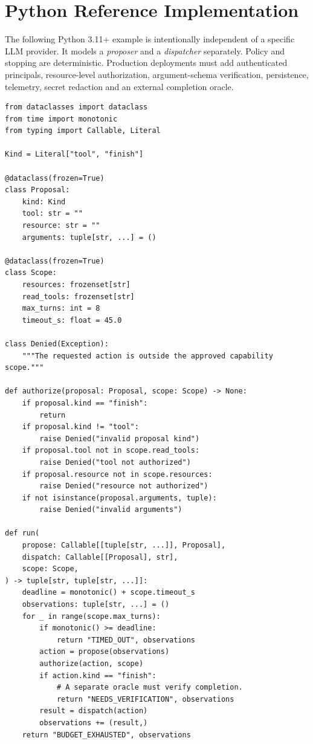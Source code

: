 
\section{Python Reference Implementation}
The following Python 3.11+ example is intentionally independent of a specific LLM provider. It models a \emph{proposer} and a \emph{dispatcher} separately. Policy and stopping are deterministic. Production deployments must add authenticated principals, resource-level authorization, argument-schema verification, persistence, telemetry, secret redaction and an external completion oracle.

\begin{verbatim}
from dataclasses import dataclass
from time import monotonic
from typing import Callable, Literal

Kind = Literal["tool", "finish"]

@dataclass(frozen=True)
class Proposal:
    kind: Kind
    tool: str = ""
    resource: str = ""
    arguments: tuple[str, ...] = ()

@dataclass(frozen=True)
class Scope:
    resources: frozenset[str]
    read_tools: frozenset[str]
    max_turns: int = 8
    timeout_s: float = 45.0

class Denied(Exception):
    """The requested action is outside the approved capability scope."""

def authorize(proposal: Proposal, scope: Scope) -> None:
    if proposal.kind == "finish":
        return
    if proposal.kind != "tool":
        raise Denied("invalid proposal kind")
    if proposal.tool not in scope.read_tools:
        raise Denied("tool not authorized")
    if proposal.resource not in scope.resources:
        raise Denied("resource not authorized")
    if not isinstance(proposal.arguments, tuple):
        raise Denied("invalid arguments")

def run(
    propose: Callable[[tuple[str, ...]], Proposal],
    dispatch: Callable[[Proposal], str],
    scope: Scope,
) -> tuple[str, tuple[str, ...]]:
    deadline = monotonic() + scope.timeout_s
    observations: tuple[str, ...] = ()
    for _ in range(scope.max_turns):
        if monotonic() >= deadline:
            return "TIMED_OUT", observations
        action = propose(observations)
        authorize(action, scope)
        if action.kind == "finish":
            # A separate oracle must verify completion.
            return "NEEDS_VERIFICATION", observations
        result = dispatch(action)
        observations += (result,)
    return "BUDGET_EXHAUSTED", observations
\end{verbatim}

